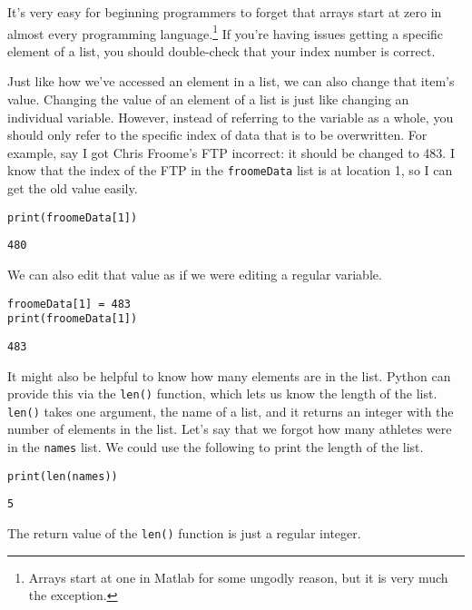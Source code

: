 It's very easy for beginning programmers to forget that arrays start at zero in almost every programming language.\footnote{Arrays start at one in Matlab for some ungodly reason, but it is very much the exception.} If you're having issues getting a specific element of a list, you should double-check that your index number is correct.\par
Just like how we've accessed an element in a list, we can also change that item's value. Changing the value of an element of a list is just like changing an individual variable. However, instead of referring to the variable as a whole, you should only refer to the specific index of data that is to be overwritten. For example, say I got Chris Froome's FTP incorrect: it should be changed to 483. I know that the index of the FTP in the \verb|froomeData| list is at location 1, so I can get the old value easily.
\begin{lstlisting}[style=pippython]
print(froomeData[1])
\end{lstlisting}
\begin{lstlisting}[style=none]
480
\end{lstlisting}
We can also edit that value as if we were editing a regular variable.
\begin{lstlisting}[style=pippython]
froomeData[1] = 483
print(froomeData[1])
\end{lstlisting}
\begin{lstlisting}[style=none]
483
\end{lstlisting}
It might also be helpful to know how many elements are in the list. Python can provide this via the \verb|len()| function, which lets us know the length of the list. \verb|len()| takes one argument, the name of a list, and it returns an integer with the number of elements in the list. Let's say that we forgot how many athletes were in the \verb|names| list. We could use the following to print the length of the list.\par
\begin{lstlisting}[style=pippython]
print(len(names))
\end{lstlisting}
\begin{lstlisting}[style=none]
5
\end{lstlisting}
The return value of the \verb|len()| function is just a regular integer.\par
